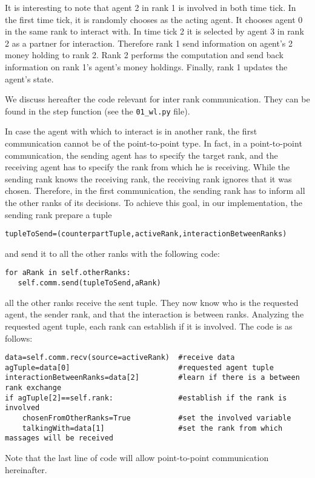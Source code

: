 \documentclass{article}
\begin{document}
It is interesting to note that agent 2 in rank 1 is involved in both time tick.
In the first time tick, it is randomly chooses as the acting agent. It chooses agent 0 in the same rank to interact with.
In time tick 2 it is selected by agent 3 in rank 2 as a partner for interaction. Therefore rank 1 send information on agent's 2 money holding to rank 2.
Rank 2 performs the computation and send back information on rank 1's agent's money holdings. Finally, rank 1 updates the agent's state.

We discuss hereafter the code relevant for inter rank communication. They can be found in the step function (see the \verb+01_wl.py+ file).  

In case the agent with which to interact is in another rank, the first communication cannot be of the point-to-point type. In fact, in a point-to-point communication, the sending agent has to specify the target rank, and the receiving agent has to specify the rank from which he is receiving. While the sending rank knows the receiving rank, the receiving rank ignores that it was chosen. Therefore, in the first communication, the sending rank has to inform all the other ranks of its decisions. To achieve this goal, in our implementation, the sending rank prepare a tuple 
\begin{verbatim}
tupleToSend=(counterpartTuple,activeRank,interactionBetweenRanks)
\end{verbatim}
and send it to all the other ranks with the following code:
\begin{verbatim}
for aRank in self.otherRanks:
   self.comm.send(tupleToSend,aRank)
\end{verbatim}
all the other ranks receive the sent tuple. They now know who is the requested agent, the sender rank, and that the interaction is between ranks.
Analyzing the requested agent tuple, each rank can establish if it is involved. The code is as follows:
\begin{verbatim}
data=self.comm.recv(source=activeRank)  #receive data
agTuple=data[0]                         #requested agent tuple
interactionBetweenRanks=data[2]         #learn if there is a between rank exchange
if agTuple[2]==self.rank:               #establish if the rank is involved
    chosenFromOtherRanks=True           #set the involved variable
    talkingWith=data[1]                 #set the rank from which massages will be received
\end{verbatim}
Note that the last line of code will allow point-to-point communication hereinafter.
\end{document}
